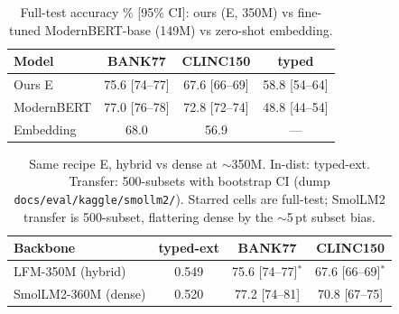 \begin{table}[htbp]
\caption{Full-test accuracy \% [95\% CI]: ours (E, 350M) vs fine-tuned
ModernBERT-base (149M) vs zero-shot embedding.}
\label{tab:encoder}
\begin{center}
\setlength{\tabcolsep}{4pt}
\begin{small}
\begin{tabular}{lccc}
\toprule
Model & BANK77 & CLINC150 & typed \\
\midrule
Ours E & 75.6 [74--77] & 67.6 [66--69] & 58.8 [54--64] \\
ModernBERT & 77.0 [76--78] & 72.8 [72--74] & 48.8 [44--54] \\
Embedding & 68.0 & 56.9 & --- \\
\bottomrule
\end{tabular}
\end{small}
\end{center}
\end{table}

\begin{table}[htbp]
\caption{Same recipe E, hybrid vs dense at $\sim$350M. In-dist: typed-ext.
Transfer: 500-subsets with bootstrap CI (dump
\texttt{docs/eval/kaggle/smollm2/}). Starred cells are full-test; SmolLM2
transfer is 500-subset, flattering dense by the $\sim$5\,pt subset bias.}
\label{tab:dense}
\begin{center}
\setlength{\tabcolsep}{3pt}
\begin{footnotesize}
\begin{tabular}{lccc}
\toprule
Backbone & typed-ext & BANK77 & CLINC150 \\
\midrule
LFM-350M (hybrid) & 0.549 & 75.6 [74--77]$^*$ & 67.6 [66--69]$^*$ \\
SmolLM2-360M (dense) & 0.520 & 77.2 [74--81] & 70.8 [67--75] \\
\bottomrule
\end{tabular}
\end{footnotesize}
\end{center}
\end{table}


